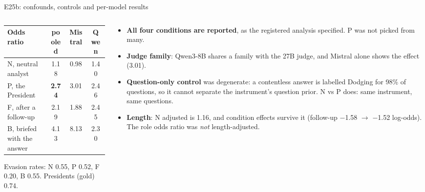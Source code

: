 \begin{frame}{E25b: confounds, controls and per-model results}
  \footnotesize
  \begin{columns}[T,onlytextwidth]
    \begin{column}{0.5\textwidth}
      \setlength{\tabcolsep}{4pt}
      \begin{tabular}{@{}lccc@{}}
        \toprule
        Odds ratio & pooled & Mistral & Qwen \\
        \midrule
        N, neutral analyst & 1.18 & 0.98 & 1.40 \\
        P, the President & \textbf{2.74} & 3.01 & 2.46 \\
        F, after a follow-up & 2.19 & 1.88 & 2.45 \\
        B, briefed with the answer & 4.13 & 8.13 & 2.30 \\
        \bottomrule
      \end{tabular}
      \vspace{1mm}

      Evasion rates: N 0.55, P 0.52, F 0.20, B 0.55. Presidents (gold) 0.74.
    \end{column}
    \begin{column}{0.47\textwidth}
      \begin{itemize}\setlength{\itemsep}{1mm}
        \item \textbf{All four conditions are reported}, as the registered analysis specified. P was not picked from many.
        \item \textbf{Judge family}: Qwen3-8B shares a family with the 27B judge, and Mistral alone shows the effect (3.01).
        \item \textbf{Question-only control} was degenerate: a contentless answer is labelled Dodging for 98\% of questions, so it cannot separate the instrument's question prior. N vs P does: same instrument, same questions.
        \item \textbf{Length}: N adjusted is 1.16, and condition effects survive it (follow-up $-$1.58 $\rightarrow$ $-$1.52 log-odds). The role odds ratio was \emph{not} length-adjusted.
      \end{itemize}
    \end{column}
  \end{columns}
\end{frame}

